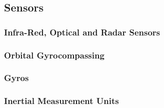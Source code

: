 \subsection{Sensors}
\subsubsection{Infra-Red, Optical and Radar Sensors}
\subsubsection{Orbital Gyrocompassing}
\subsubsection{Gyros}
\subsubsection{Inertial Measurement Units}